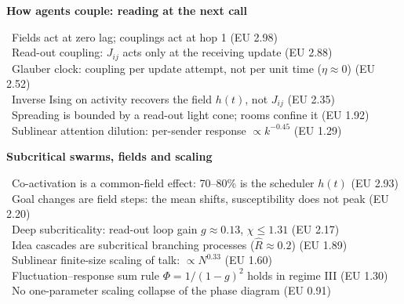 \begin{frame}
\vfill{\Large\bfseries How agents couple: reading at the next call}\par\vspace{0.8em}
{\small
{}\ Fields act at zero lag; couplings act at hop 1 {\color{muted}(EU 2.98)}\\[0.25em]
\ Read-out coupling: $J_{ij}$ acts only at the receiving update {\color{muted}(EU 2.88)}\\[0.25em]
\ Glauber clock: coupling per update attempt, not per unit time ($\eta\approx0$) {\color{muted}(EU 2.52)}\\[0.25em]
\ Inverse Ising on activity recovers the field $h(t)$, not $J_{ij}$ {\color{muted}(EU 2.35)}\\[0.25em]
\ Spreading is bounded by a read-out light cone; rooms confine it {\color{muted}(EU 1.92)}\\[0.25em]
\ Sublinear attention dilution: per-sender response $\propto k^{-0.45}$ {\color{muted}(EU 1.29)}}
\vfill
\end{frame}






\begin{frame}
\vfill{\Large\bfseries Subcritical swarms, fields and scaling}\par\vspace{0.8em}
{\small
{}\ Co-activation is a common-field effect: 70--80\% is the scheduler $h(t)$ {\color{muted}(EU 2.93)}\\[0.25em]
\ Goal changes are field steps: the mean shifts, susceptibility does not peak {\color{muted}(EU 2.20)}\\[0.25em]
\ Deep subcriticality: read-out loop gain $g\approx0.13$, $\chi\le1.31$ {\color{muted}(EU 2.17)}\\[0.25em]
\ Idea cascades are subcritical branching processes ($\hat R\approx0.2$) {\color{muted}(EU 1.89)}\\[0.25em]
\ Sublinear finite-size scaling of talk: $\propto N^{0.33}$ {\color{muted}(EU 1.60)}\\[0.25em]
\ Fluctuation--response sum rule $\Phi=1/(1-g)^2$ holds in regime III {\color{muted}(EU 1.30)}\\[0.25em]
\ No one-parameter scaling collapse of the phase diagram {\color{muted}(EU 0.91)}}
\vfill
\end{frame}
